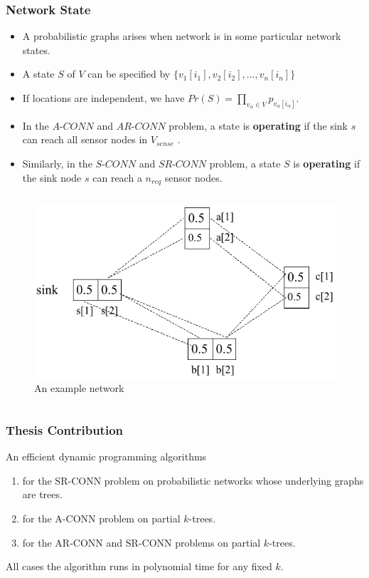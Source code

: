 \documentclass{beamer}
\newcommand{\ACONN}   { {\mathrm {A\mbox{-}CONN}} }
\newcommand{\ARCONN}   { {\mathrm {AR\mbox{-}CONN}} }
\newcommand{\SRCONN}   { {\mathrm {SR\mbox{-}CONN}} }
\begin{document}
\begin{frame}
\frametitle{Network State}
\begin{itemize}
\item A probabilistic graphs arises when network is in some particular network states.
\item A state $S$ of $V$ can be specified by $\{v_1[i_1], v_2[i_2], . . . , v_n[i_n]\}$
\item If locations are independent, we have $Pr(S) =\prod_{v_{\alpha}\in V} p_{v_\alpha[i_\alpha]}$.

\item In the $A$-$CONN$ and $AR$-$CONN$ problem, a state is \textbf{operating} if the
sink $s$ can reach all sensor nodes in $V_{sense}$ . 
\item Similarly, in the $S$-$CONN$ and $SR$-$CONN$ problem, a state $S$ is \textbf{operating} if the sink node $s$ can reach a $n_{req}$ sensor
nodes.
\end{itemize}
\vspace*{-0.5 cm}
\begin{columns}
\vspace*{-0.5 cm}

\begin{figure}[h]
\centering
\includegraphics[width=1.8 in, height=1 in]{Figure1.pdf}
\vspace*{-0.5 cm}
 \caption{ An example network}
\end{figure}
\end{columns}
\end{frame}
\begin{frame}
\frametitle{Thesis Contribution}
An efficient dynamic programming algorithms
\begin{enumerate}
\item for the $\SRCONN$ problem on probabilistic networks whose underlying graphs are trees.%
\item for the $\ACONN$ problem on partial $k$-trees.
\item for the $\ARCONN$ and $\SRCONN$ problems on partial $k$-trees.
\end{enumerate}
All cases the algorithm runs in polynomial time for any fixed $k$. 
\end{frame}
\end{document}
